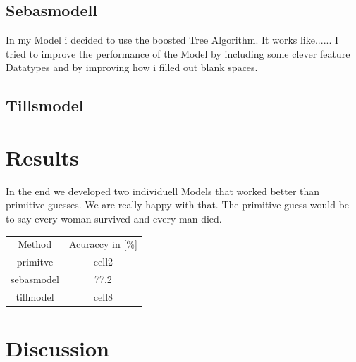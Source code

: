 \documentclass[
   10.5pt,
   invert-title=true,
   titlepage=false,
   titleimage-ratio=13,
   class=article
]{bfhpub}				%
\begin{document}
\subsection*{Sebasmodell}
In my Model i decided to use the boosted Tree Algorithm. It works like......
I tried to improve the performance of the Model by including some clever feature Datatypes and by improving how i filled out blank spaces.

\subsection*{Tillsmodel}

\section*{Results}
In the end we developed two individuell Models that worked better than primitive guesses. We are really happy with that. The primitive guess would be to say every woman survived and every man died.

\begin{center}
	\begin{tabular}{ c c }
		Method & Acuraccy in [\%] \\
		primitve & cell2 \\ 
		sebasmodel & 77.2 \\
		tillmodel & cell8    
	\end{tabular}
\end{center}

\section*{Discussion}



\end{document}
